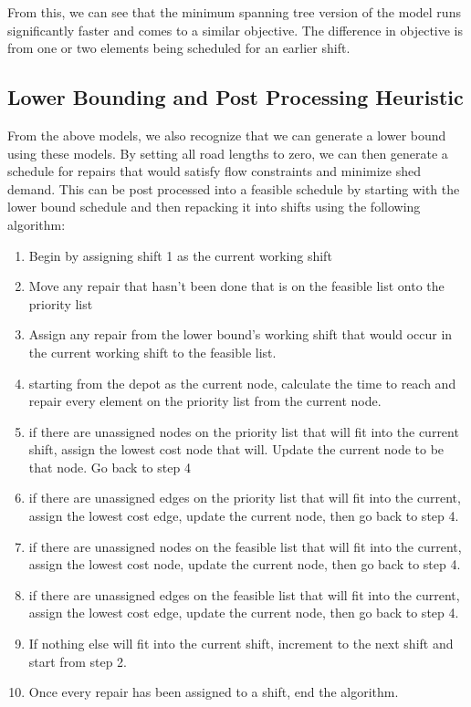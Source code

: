 \documentclass{article}
\begin{document}
From this, we can see that the minimum spanning tree version of the model runs significantly faster and comes to a similar objective. The difference in objective is from one or two elements being scheduled for an earlier shift.

	\subsection{Lower Bounding and Post Processing Heuristic}
	
	From the above models, we also recognize that we can generate a lower bound using these models. By setting all road lengths to zero, we can then generate a schedule for repairs that would satisfy flow constraints and minimize shed demand. This can be post processed into a feasible schedule by starting with the lower bound schedule and then repacking it into shifts using the following algorithm:
	\begin{enumerate}
		\item Begin by assigning shift 1 as the current working shift
		\item Move any repair that hasn't been done that is on the feasible list onto the priority list
		\item Assign any repair from the lower bound's working shift that would occur in the current working shift to the feasible list.
		\item starting from the depot as the current node, calculate the time to reach and repair every element on the priority list from the current node.
		\item if there are unassigned nodes on the priority list that will fit into the current shift, assign the lowest cost node that will. Update the current node to be that node. Go back to step 4 
		\item if there are unassigned edges on the priority list that will fit into the current, assign the lowest cost edge, update the current node, then go back to step 4.
		\item if there are unassigned nodes on the feasible list that will fit into the current, assign the lowest cost node, update the current node, then go back to step 4.
		\item if there are unassigned edges on the feasible list that will fit into the current, assign the lowest cost edge, update the current node, then go back to step 4.
		\item If nothing else will fit into the current shift, increment to the next shift and start from step 2.
		\item Once every repair has been assigned to a shift, end the algorithm.
	\end{enumerate}
	
\end{document}
